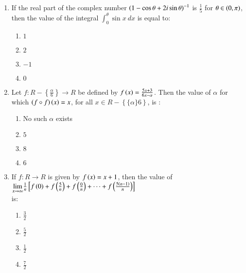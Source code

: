 \documentclass[journal,9pt,onecolumn]{IEEEtran}
\begin{document}
\begin{enumerate}
    \item If the real part of the complex number $\left(1-\cos\theta + 2i\sin\theta\right)^{-1}$ is $\frac{1}{5}$ for $\theta\in\left(0,\pi\right)$, then the value of the integral $\int_0^\theta\sin x\ dx$ is equal to:

        \begin{multicols}{4}
            \begin{enumerate}
                \item $1$
                \item $2$
                \item $-1$
                \item $0$
            \end{enumerate}
        \end{multicols}
		
    \item Let $f:R-\left\{\frac{\alpha}{6}\right\}\rightarrow R$ be defined by $f\left(x\right)=\frac{5x+3}{6x-\alpha}$. Then the value of $\alpha$ for which $\left(f\circ f\right)\left(x\right)=x$, for all $x\in R-\left\{\{\alpha\}{6}\right\}$, is :

        \begin{multicols}{2}
            \begin{enumerate}
                \item No such $\alpha$ exists
                \item $5$
                \item $8$
                \item $6$
            \end{enumerate}
        \end{multicols}
	
    \item If $f:R\rightarrow R$ is given by $f\left(x\right)=x+1$, then the value of\\
    $\underset{x\to\infty}{\lim}\frac{1}{n}\left[f\left(0\right)+f\left(\frac{5}{n}\right)+f\left(\frac{0}{n}\right)+\cdots+f\left(\frac{5\left(n-1\right)}{n}\right)\right]$\\ is:

        \begin{multicols}{4}
            \begin{enumerate}
                \item $\frac{3}{2}$
                \item $\frac{5}{2}$
                \item $\frac{1}{2}$
                \item $\frac{7}{2}$
            \end{enumerate}
        \end{multicols}


\end{enumerate}
\end{document}
